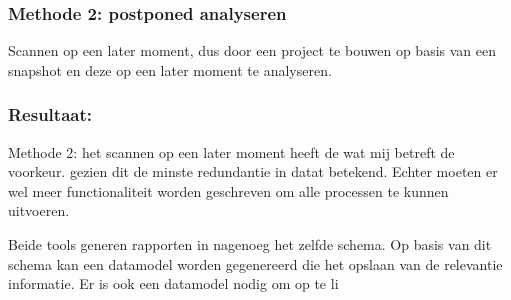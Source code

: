 \subsubsection{Methode 2: postponed analyseren}
Scannen op een later moment, dus door een project te bouwen op basis van een snapshot en deze op een later moment te analyseren.

\subsubsection{Resultaat:} Methode 2: het scannen op een later moment heeft de wat mij betreft de voorkeur. gezien dit de minste redundantie in datat betekend. Echter moeten er wel meer functionaliteit worden geschreven om alle processen te kunnen uitvoeren.

Beide tools generen rapporten in nagenoeg het zelfde schema. Op basis van dit schema kan een datamodel worden gegenereerd die het opslaan van de relevantie informatie. Er is ook een datamodel nodig om op te li


